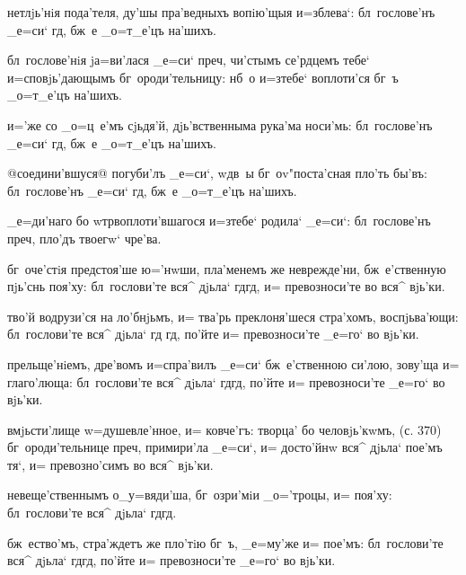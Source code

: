 нетлjь'нiя пода'теля, ду'шы пра'ведныхъ вопiю'щыя 
и=зблева`: бл~гослове'нъ _е=си` гд, бж~е _о=т_е'цъ 
на'шихъ.

бл~гослове'нiя jа=ви'лася _е=си` преч, чи'стымъ 
се'рдцемъ тебе` и=сповjь'дающымъ бг~ороди'тельницу: нб~о 
и=з\ъ тебе` воплоти'ся бг~ъ _о=т_е'цъ на'шихъ.


и='же со _о=ц~е'мъ сjьдя'й, дjь'вственныма рука'ма 
носи'мь: бл~гослове'нъ _е=си` гд, бж~е _о=т_е'цъ 
на'шихъ.

{@соедини'вшуся@} погуби'лъ _е=си`, w\т дв~ы 
бг~оv"поста'сная пло'ть бы'въ: бл~гослове'нъ _е=си` 
гд, бж~е _о=т_е'цъ на'шихъ.

_е=ди'наго бо w\т тр воплоти'вшагося и=з\ъ тебе` 
родила` _е=си`: бл~гослове'нъ преч, пло'дъ твоегw` 
чре'ва.


бг~оче'стiя предстоя'ше ю='нwши, пла'менемъ же 
неврежде'ни, бж~е'ственную пjь'снь поя'ху: бл~гослови'те 
вся^ дjьла` гд гд, и= превозноси'те во вся^ 
вjь'ки.

тво'й водрузи'ся на ло'бнjьмъ, и= тва'рь преклоня'шеся 
стра'хомъ, воспjьва'ющи: бл~гослови'те вся^ дjьла` гд 
гд, по'йте и= превозноси'те _е=го` во вjь'ки.

прельще'нiемъ, дре'вомъ и=спра'вилъ _е=си` бж~е'ственною 
си'лою, зову'ща и= глаго'люща: бл~гослови'те вся^ дjьла` 
гд гд, по'йте и= превозноси'те _е=го` во вjь'ки.

вмjьсти'лище w=душевле'нное, и= ковче'гъ: творца' бо 
человjь'кwмъ, (с. 370) бг~ороди'тельнице преч, 
примири'ла _е=си`, и= досто'йнw вся^ дjьла` пое'мъ тя`, 
и= превозно'симъ во вся^ вjь'ки.


невеще'ственнымъ о_у=вяди'ша, бг~озри'мiи _о='троцы, и= 
поя'ху: бл~гослови'те вся^ дjьла` гд гд.

бж~ество'мъ, стра'ждетъ же пло'тiю бг~ъ, _е=му'же и= 
пое'мъ: бл~гослови'те вся^ дjьла` гд гд, по'йте и= 
превозноси'те _е=го` во вjь'ки.

